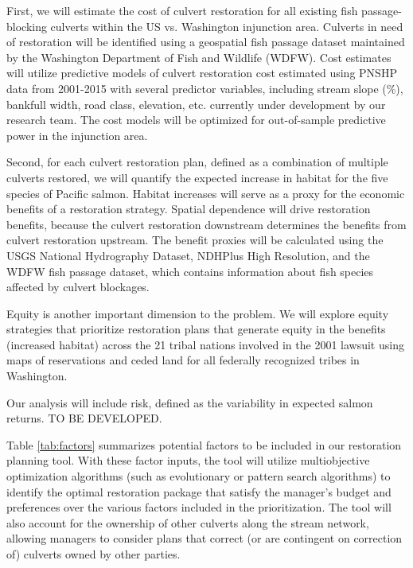 \documentclass[12pt]{elsarticle}
\begin{document}
First, we will estimate the cost of culvert restoration for all existing fish passage-blocking culverts within the US vs. Washington injunction area. Culverts in need of restoration will be identified using a geospatial fish passage dataset maintained by the Washington Department of Fish and Wildlife (WDFW). Cost estimates will utilize predictive models of culvert restoration cost estimated using PNSHP data from 2001-2015 with several predictor variables, including stream slope (\%), bankfull width, road class, elevation, etc. currently under development by our research team. The cost models will be optimized for out-of-sample predictive power in the injunction area.

Second, for each culvert restoration plan, defined as a combination of multiple culverts restored, we will quantify the expected increase in habitat for the five species of Pacific salmon. Habitat increases will serve as a proxy for the economic benefits of a restoration strategy. Spatial dependence will drive restoration benefits, because the culvert restoration downstream determines the benefits from culvert restoration upstream. The benefit proxies will be calculated using the USGS National Hydrography Dataset, NDHPlus High Resolution, and the WDFW fish passage dataset, which contains information about fish species affected by culvert blockages.

Equity is another important dimension to the problem. We will explore equity strategies that prioritize restoration plans that generate equity in the benefits (increased habitat) across the 21 tribal nations involved in the 2001 lawsuit using maps of reservations and ceded land for all federally recognized tribes in Washington. 

Our analysis will include risk, defined as the variability in expected salmon returns. TO BE DEVELOPED.

Table \ref{tab:factors} summarizes potential factors to be included in our restoration planning tool. With these factor inputs, the tool will utilize multiobjective optimization algorithms (such as evolutionary or pattern search algorithms) to identify the optimal restoration package that satisfy the manager's budget and preferences over the various factors included in the prioritization. The tool will also account for the ownership of other culverts along the stream network, allowing managers to consider plans that correct (or are contingent on correction of) culverts owned by other parties.
\end{document}
